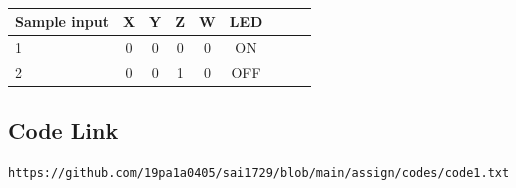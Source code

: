 \documentclass[10pt, a4paper]{article}
\begin{document}
\begin{table}[htbp]
 \begin{center}
    \begin{tabular}{|l|c|c|c|c|c|c|c|c} \hline \textbf{Sample input}
  & \textbf{X} & \textbf{Y} & \textbf{Z}& \textbf{W}& \textbf{LED } \\
 \hline
1&0&0&0&0&ON\\ \hline
2&0&0&1&0&OFF \\ \hline
\end{tabular}   
\end{center}
\caption{\label{table:dummytable} }
\end{table}

\subsection{Code Link}
\vspace{5mm}
\begin{lstlisting}
https://github.com/19pa1a0405/sai1729/blob/main/assign/codes/code1.txt
\end{lstlisting}
\end{document}
